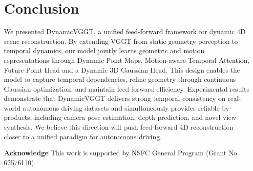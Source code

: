 \section{Conclusion}

We presented DynamicVGGT, a unified feed-forward framework for dynamic 4D scene reconstruction.
By extending VGGT from static geometry perception to temporal dynamics, our model jointly learns geometric and motion representations through Dynamic Point Maps, Motion-aware Temporal Attention, Future Point Head and a Dynamic 3D Gaussian Head.
This design enables the model to capture temporal dependencies, refine geometry through continuous Gaussian optimization, and maintain feed-forward efficiency. Experimental results demonstrate that DynamicVGGT delivers strong temporal consistency on real-world autonomous driving datasets and simultaneously provides reliable by-products, including camera pose estimation, depth prediction, and novel view synthesis.
We believe this direction will push feed-forward 4D reconstruction closer to a unified paradigm for autonomous driving.

\noindent \textbf{Acknowledge} This work is supported  by NSFC General Program (Grant No. 62576110).